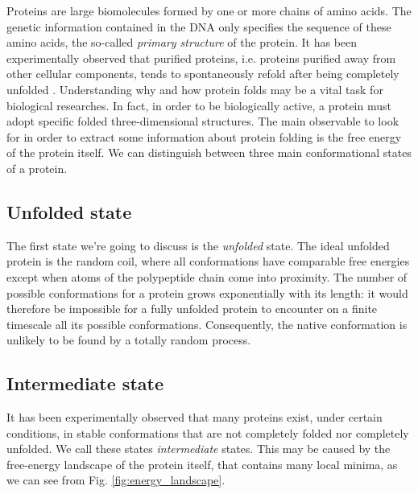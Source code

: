 Proteins are large biomolecules formed by one or more chains of amino acids.
The genetic information contained in the DNA only specifies the sequence of these amino acids, the so-called \emph{primary structure} of the protein.
It has been experimentally observed that purified proteins, i.e. proteins purified away from other cellular components, tends to spontaneously refold after being completely unfolded \cite{ProteinFolding1990}.
Understanding why and how protein folds may be a vital task for biological researches.
In fact, in order to be biologically active, a protein must adopt specific folded three-dimensional structures.
The main observable to look for in order to extract some information about protein folding is the free energy of the protein itself.
We can distinguish between three main conformational states of a protein.

\subsection{Unfolded state}
The first state we're going to discuss is the \emph{unfolded} state.
The ideal unfolded protein is the random coil, where all conformations have comparable free energies except when atoms of the polypeptide chain come into proximity.
The number of possible conformations for a protein grows exponentially with its length: it would therefore be impossible for a fully unfolded protein to encounter on a finite timescale all its possible conformations.
Consequently, the native conformation is unlikely to be found by a totally random process.

\subsection{Intermediate state}
It has been experimentally observed that many proteins exist, under certain conditions, in stable conformations that are not completely folded nor completely unfolded.
We call these states \emph{intermediate} states.
This may be caused by the free-energy landscape of the protein itself, that contains many local minima, as we can see from Fig. \ref{fig:energy_landscape}.

